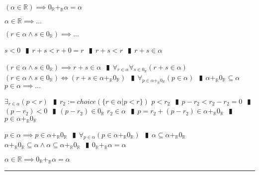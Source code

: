 \documentclass{book}
\newcommand{\wff}[1]{\hypertarget{#1}{\fbox{\textcolor{red}{$#1$}}\phantom{--}}}
\newcommand{\abr}{:=}
\newcommand{\pipe}{$\phantom{(}\vrectangleblack\phantom{)}$}
\begin{document}
\wff{FieldAdditionIdentityOfR} $(\alpha \in \mathbb{R}) \implies 0_{\mathbb{R}} +_{\mathbb{R}} \alpha = \alpha$
\begin{enumerate}
  \lit $\alpha \in \mathbb{R} \implies \ldots$
  \begin{enumerate}
    \lit $(r \in \alpha \land s \in 0_{\mathbb{R}}) \implies \ldots$
    \begin{enumerate}
      \lit $s < 0$ \pipe $r + s < r + 0 = r$ \pipe $r + s < r$ \pipe $r + s \in \alpha$
    \end{enumerate}
    \lit $(r \in \alpha \land s \in 0_{\mathbb{R}}) \implies r + s \in \alpha$ \pipe $\forall_{r \in \alpha} \forall_{s \in 0_{\mathbb{R}}}(r + s \in \alpha)$
    \lit $(r \in \alpha \land s \in 0_{\mathbb{R}}) \iff (r + s \in \alpha +_{\mathbb{R}} 0_{\mathbb{R}})$ \pipe $\forall_{p \in \alpha +_{\mathbb{R}} 0_{\mathbb{R}}}(p \in \alpha)$ \pipe $\alpha +_{\mathbb{R}} 0_{\mathbb{R}} \subseteq \alpha$
    \lit $p \in \alpha \implies \ldots$
    \begin{enumerate}
      \lit $\exists_{r \in \alpha}(p < r)$ \pipe $r_2 \abr choice(\{r \in \alpha | p < r\})$
      \lit $p < r_2$ \pipe $p - r_2 < r_2 - r_2 = 0$ \pipe $(p - r_2 )< 0$ \pipe $(p - r_2) \in 0_{\mathbb{R}}$
      \lit $r_2 \in \alpha$ \pipe $p = r_2 + (p - r_2) \in \alpha +_{\mathbb{R}} 0_{\mathbb{R}}$ \pipe $p \in \alpha +_{\mathbb{R}} 0_{\mathbb{R}}$
    \end{enumerate}
    \lit $p \in \alpha \implies p \in \alpha +_{\mathbb{R}} 0_{\mathbb{R}}$ \pipe $\forall_{p \in \alpha}(p \in \alpha +_{\mathbb{R}} 0_{\mathbb{R}})$ \pipe $\alpha \subseteq \alpha +_{\mathbb{R}} 0_{\mathbb{R}}$
    \lit $\alpha +_{\mathbb{R}} 0_{\mathbb{R}} \subseteq \alpha \land \alpha \subseteq \alpha +_{\mathbb{R}} 0_{\mathbb{R}}$ \pipe $0_{\mathbb{R}} +_{\mathbb{R}} \alpha = \alpha$
  \end{enumerate}
  \lit $\alpha \in \mathbb{R} \implies 0_{\mathbb{R}} +_{\mathbb{R}} \alpha = \alpha$
\end{enumerate} \vspace{.75mm} \hrule \vspace{.75mm} \ \\
\end{document}
